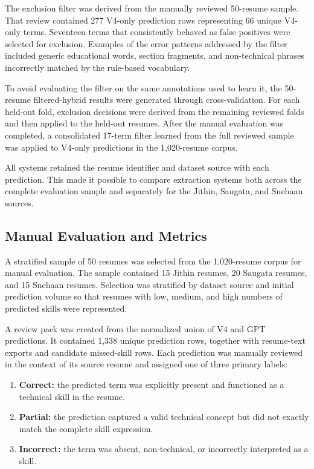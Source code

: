 \documentclass[conference]{IEEEtran}
\begin{document}
The exclusion filter was derived from the manually reviewed 50-resume
sample. That review contained 277 V4-only prediction rows representing
66 unique V4-only terms. Seventeen terms that consistently behaved as
false positives were selected for exclusion. Examples of the error
patterns addressed by the filter included generic educational words,
section fragments, and non-technical phrases incorrectly matched by
the rule-based vocabulary.

To avoid evaluating the filter on the same annotations used to learn
it, the 50-resume filtered-hybrid results were generated through
cross-validation. For each held-out fold, exclusion decisions were
derived from the remaining reviewed folds and then applied to the
held-out resumes. After the manual evaluation was completed, a
consolidated 17-term filter learned from the full reviewed sample was
applied to V4-only predictions in the 1,020-resume corpus.

All systems retained the resume identifier and dataset source with each
prediction. This made it possible to compare extraction systems both
across the complete evaluation sample and separately for the Jithin,
Saugata, and Snehaan sources.

\subsection{Manual Evaluation and Metrics}

A stratified sample of 50 resumes was selected from the 1,020-resume
corpus for manual evaluation. The sample contained 15 Jithin resumes,
20 Saugata resumes, and 15 Snehaan resumes. Selection was stratified by
dataset source and initial prediction volume so that resumes with low,
medium, and high numbers of predicted skills were represented.

A review pack was created from the normalized union of V4 and GPT
predictions. It contained 1,338 unique prediction rows, together with
resume-text exports and candidate missed-skill rows. Each prediction
was manually reviewed in the context of its source resume and assigned
one of three primary labels:

\begin{enumerate}
    \item \textbf{Correct:} the predicted term was explicitly present
    and functioned as a technical skill in the resume.

    \item \textbf{Partial:} the prediction captured a valid technical
    concept but did not exactly match the complete skill expression.

    \item \textbf{Incorrect:} the term was absent, non-technical, or
    incorrectly interpreted as a skill.
\end{enumerate}
\end{document}
